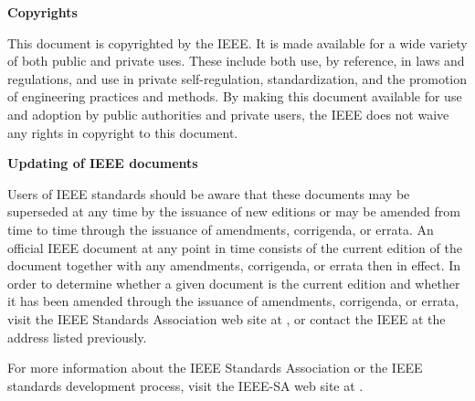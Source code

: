 \textbf{Copyrights}

This document is copyrighted by the IEEE. It is made available for a wide variety of both public and private uses. These include both use, by reference, in laws and regulations, and use in private self-regulation, standardization, and the promotion of engineering practices and methods. By making this document available for use and adoption by public authorities and private users, the IEEE does not waive any rights in copyright to this document.

\textbf{Updating of IEEE documents}

Users of IEEE standards should be aware that these documents may be superseded at any time by the issuance of new editions or may be amended from time to time through the issuance of amendments, corrigenda, or errata. An official IEEE document at any point in time consists of the current edition of the document together with any amendments, corrigenda, or errata then in effect. In order to determine whether a given document is the current edition and whether it has been amended through the issuance of amendments, corrigenda, or errata, visit the IEEE Standards Association web site at , or contact the IEEE at the address listed previously.

For more information about the IEEE Standards Association or the IEEE standards development process, visit the IEEE-SA web site at .
\clearpage
